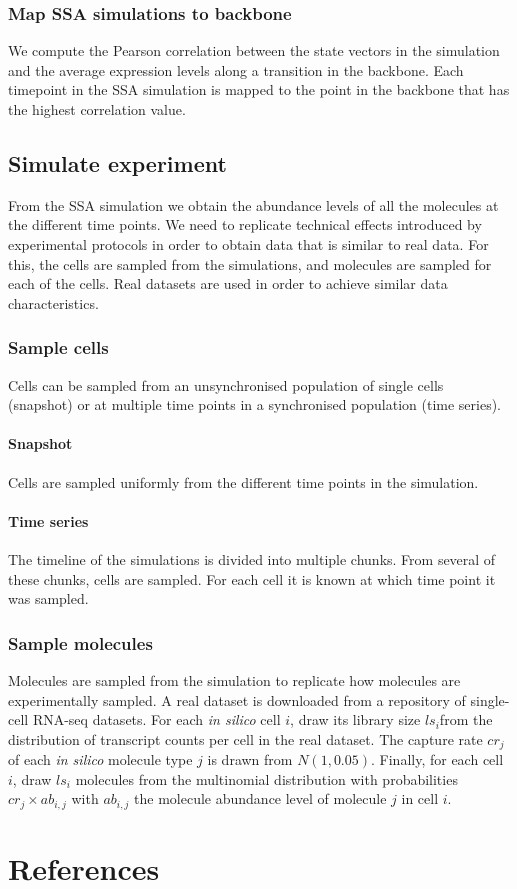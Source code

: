 \subsubsection{Map SSA simulations to backbone}
We compute the Pearson correlation between the state vectors in the simulation and the average expression levels along a transition in the backbone. Each timepoint in the SSA simulation is mapped to the point in the backbone that has the highest correlation value.

\subsection{Simulate experiment}
From the SSA simulation we obtain the abundance levels of all the molecules at the different time points. We need to replicate technical effects introduced by experimental protocols in order to obtain data that is similar to real data. For this, the cells are sampled from the simulations, and molecules are sampled for each of the cells. Real datasets are used in order to achieve similar data characteristics.

\subsubsection{Sample cells}
Cells can be sampled from an unsynchronised population of single cells (snapshot) or at multiple time points in a synchronised population (time series).

\paragraph{Snapshot} Cells are sampled uniformly from the different time points in the simulation.

\paragraph{Time series} The timeline of the simulations is divided into multiple chunks. From several of these chunks, cells are sampled. For each cell it is known at which time point it was sampled.

\subsubsection{Sample molecules} 
Molecules are sampled from the simulation to replicate how molecules are experimentally sampled. A real dataset is downloaded from a repository of single-cell RNA-seq datasets\cite{cannoodt_singlecellomicsdatasets_2018}. For each \textit{in silico} cell $i$, draw its library size $ls_i$from the distribution of transcript counts per cell in the real dataset. The capture rate $cr_j$ of each \textit{in silico} molecule type $j$ is drawn from $N(1, 0.05)$. Finally, for each cell $i$, draw $ls_i$ molecules from the multinomial distribution with probabilities $cr_j \times ab_{i,j}$ with $ab_{i,j}$ the molecule abundance level of molecule $j$ in cell $i$.


\clearpage
\section{References}
\printbibliography[heading=none]

